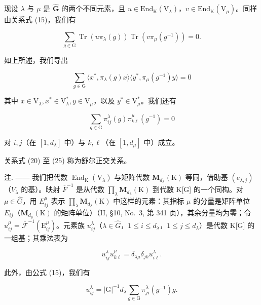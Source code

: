 现设 \(\lambda\) 与 \(\mu\) 是 \(\widehat{\mathbf{G}}\) 的两个不同元素，且 \(u \in \mathrm{End}_{\mathrm{K}}(\mathrm{V}_{\lambda})\)，\(v \in \mathrm{End}_{\mathrm{K}}(\mathrm{V}_{\mu})\)。同样由关系式 (15)，我们有

\[
\sum_ {g \in \mathrm{G}} \operatorname{Tr} (u \pi_ {\lambda} (g)) \operatorname{Tr} (v \pi_ {\mu} (g ^ {- 1})) = 0.\tag{23}
\]

如上所述，我们导出

\[
\sum_ {g \in \mathrm{G}} \langle x ^ {*}, \pi_ {\lambda} (g) x \rangle \langle y ^ {*}, \pi_ {\mu} (g ^ {- 1}) y \rangle = 0\tag{24}
\]

其中 \(x\in \mathrm{V}_{\lambda},x^{*}\in \mathrm{V}_{\lambda}^{*},y\in \mathrm{V}_{\mu}\)，以及 \(y^{*}\in \mathrm{V}_{\mu}^{*}\)。我们还有

\[
\sum_ {g \in \mathrm{G}} \pi_ {i j} ^ {\lambda} (g) \pi_ {k \ell} ^ {\mu} (g ^ {- 1}) = 0\tag{25}
\]

对 \(i,j\)（在 \([1,d_{\lambda}]\) 中）与 \(k,\ell\)（在 \([1,d_{\mu}]\) 中）成立。

关系式 (20) 至 (25) 称为舒尔正交关系。

注. —— 我们把代数 \(\operatorname{End}_{\mathrm{K}}(\mathrm{V}_{\lambda})\) 与矩阵代数 \(\mathbf{M}_{d_{\lambda}}(\mathrm{K})\) 等同，借助基 \((e_{\lambda,j})\)（\(V_{\lambda}\) 的基）。映射 \(\overline{F}^{-1}\) 是从代数 \(\prod_{\lambda}\mathbf{M}_{d_{\lambda}}(\mathrm{K})\) 到代数 K{[}G{]} 的一个同构。对 \(\mu\in\widehat{G}\)，用 \(E_{ij}^{\mu}\) 表示 \(\prod_{\lambda}\mathbf{M}_{d_{\lambda}}(\mathrm{K})\) 中这样的元素：其指标 \(\mu\) 的分量是矩阵单位 \(E_{ij}\)（\(\mathbf{M}_{d_{\mu}}(\mathrm{K})\) 的矩阵单位）（II, §10, No.~3, 第 341 页），其余分量均为零；令 \(u_{ij}^{\mu}=\overline{\mathcal{F}}^{-1}(\mathrm{E}_{ij}^{\mu})\)。元素族 \(u_{ij}^{\lambda}\)（\(\lambda\in\widehat{G}\)，\(1\leqslant i\leqslant d_{\lambda}\)，\(1\leqslant j\leqslant d_{\lambda}\)）是代数 K{[}G{]} 的一组基；其乘法表为

\[
u _ {i j} ^ {\lambda} u _ {k \ell} ^ {\mu} = \delta_ {\lambda \mu} \delta_ {j k} u _ {i \ell} ^ {\lambda}.\tag{26}
\]

此外，由公式 (15)，我们有

\[
u _ {i j} ^ {\lambda} = | \mathrm{G} | ^ {- 1} d _ {\lambda} \sum_ {g \in \mathrm{G}} \pi_ {j i} ^ {\lambda} (g ^ {- 1}) g.\tag{27}
\]

